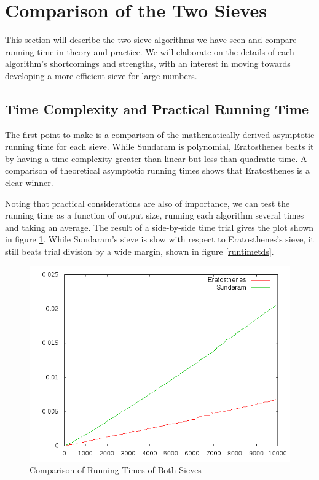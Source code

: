\documentclass{amsart}
\theoremstyle{definition}
\theoremstyle{case}
\begin{document}
	\section{Comparison of the Two Sieves}
	
	This section will describe the two sieve algorithms we have seen and compare running time in theory and practice. We will elaborate on the details of each algorithm's shortcomings and strengths, with an interest in moving towards developing a more efficient sieve for large numbers.
	
	\subsection{Time Complexity and Practical Running Time}
	The first point to make is a comparison of the mathematically derived asymptotic running time for each sieve. While Sundaram is polynomial, Eratosthenes beats it by having a time complexity greater than linear but less than quadratic time. A comparison of theoretical asymptotic running times shows that Eratosthenes is a clear winner.
	
	Noting that practical considerations are also of importance, we can test the running time as a function of output size, running each algorithm several times and taking an average. The result of a side-by-side time trial gives the plot shown in figure \ref{runtimevs}. While Sundaram's sieve is slow with respect to Eratosthenes's sieve, it still beats trial division by a wide margin, shown in figure \ref{runtimetds}.
	
	\begin{figure}\caption{Comparison of Running Times of Both Sieves}
		\label{runtimevs}
		\includegraphics[scale=0.5]{both1.png}
	\end{figure}
	
\end{document}

